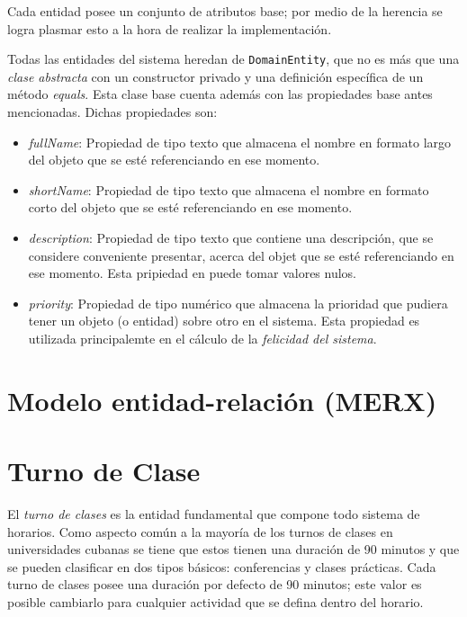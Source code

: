 Cada entidad posee un conjunto de atributos base; por medio de la herencia se logra plasmar esto a la hora de realizar la implementación. 

Todas las entidades del sistema heredan de \texttt{DomainEntity}, que no es más que una \textit{clase abstracta} con un constructor privado y una definición específica de un método \textit{equals}. Esta clase base cuenta además con las propiedades base antes mencionadas. Dichas propiedades son:

\label{props:base}
\begin{itemize}
	\item \textsl{fullName}: Propiedad de tipo texto que almacena el nombre en formato largo del objeto que se esté referenciando en ese momento. 
	\item \textsl{shortName}: Propiedad de tipo texto que almacena el nombre en formato corto del objeto que se esté referenciando en ese momento. 
	\item \textsl{description}: Propiedad de tipo texto que contiene una descripción, que se considere conveniente presentar, acerca del objet que se esté referenciando en ese momento. Esta pripiedad en puede tomar valores nulos.
	\item \textsl{priority}: Propiedad de tipo numérico que almacena la prioridad que pudiera tener un objeto (o entidad) sobre otro en el sistema. Esta propiedad es utilizada principalemte en el cálculo de la \textit{felicidad del sistema}.

\end{itemize}



\section{Modelo entidad-relación (MERX)}


\section{Turno de Clase}
\label{sec:classes}

El \textit{turno de clases} es la entidad fundamental que compone todo sistema de horarios. Como aspecto común a la mayoría de los turnos de clases en universidades cubanas se tiene que estos tienen una duración de 90 minutos y que se pueden clasificar en dos tipos básicos: conferencias y clases prácticas. Cada turno de clases posee una duración por defecto de 90 minutos; este valor es posible cambiarlo para cualquier actividad que se defina dentro del horario. 

